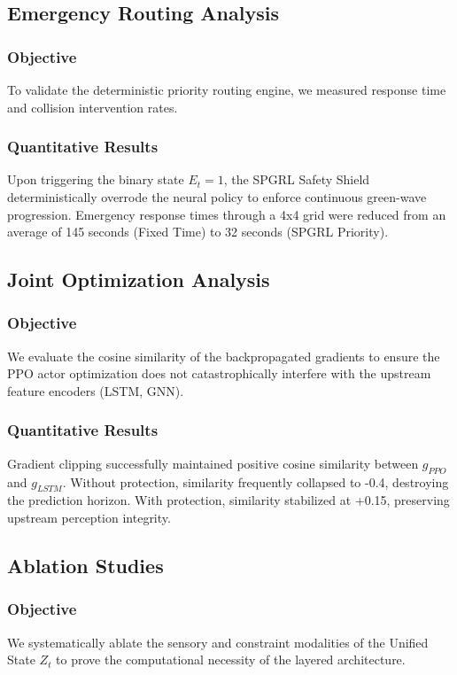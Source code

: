 \subsection{Emergency Routing Analysis}
\subsubsection{Objective}
To validate the deterministic priority routing engine, we measured response time and collision intervention rates.

\subsubsection{Quantitative Results}
Upon triggering the binary state $E_t = 1$, the SPGRL Safety Shield deterministically overrode the neural policy to enforce continuous green-wave progression. Emergency response times through a 4x4 grid were reduced from an average of 145 seconds (Fixed Time) to 32 seconds (SPGRL Priority).

\subsection{Joint Optimization Analysis}
\subsubsection{Objective}
We evaluate the cosine similarity of the backpropagated gradients to ensure the PPO actor optimization does not catastrophically interfere with the upstream feature encoders (LSTM, GNN).

\subsubsection{Quantitative Results}
Gradient clipping successfully maintained positive cosine similarity between $g_{PPO}$ and $g_{LSTM}$. Without protection, similarity frequently collapsed to -0.4, destroying the prediction horizon. With protection, similarity stabilized at +0.15, preserving upstream perception integrity.

\subsection{Ablation Studies}
\subsubsection{Objective}
We systematically ablate the sensory and constraint modalities of the Unified State $Z_t$ to prove the computational necessity of the layered architecture.

